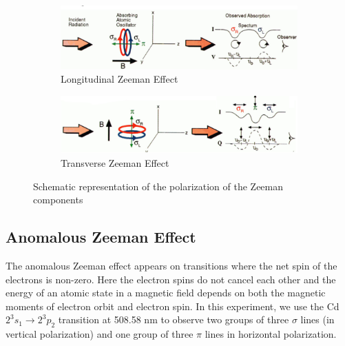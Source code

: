 
\begin{figure}
    \centering
    \begin{subfigure}[b]{0.48\textwidth}
        \centering
        \includegraphics[width=\textwidth]{images/f1.png}
        \caption{Longitudinal Zeeman Effect}
    \end{subfigure}
    \begin{subfigure}[b]{0.48\textwidth}
        \centering
        \includegraphics[width=\textwidth]{images/f2.png}
        \caption{Transverse Zeeman Effect}
    \end{subfigure}
    \caption{Schematic representation of the polarization of the Zeeman components}\label{fields}
\end{figure}

\subsection*{Anomalous Zeeman Effect}

The anomalous Zeeman effect appears on transitions where the net spin of the electrons is non-zero. Here the electron spins do not cancel each other and the
energy of an atomic state in a magnetic field depends on
both the magnetic moments of electron orbit and electron spin. In this experiment, we use the Cd $2^3s_1\rightarrow 2^3p_2$ transition at 508.58 nm to observe two groups of three $\sigma$
lines (in vertical polarization) and one group of three $\pi$ lines
in horizontal polarization.
